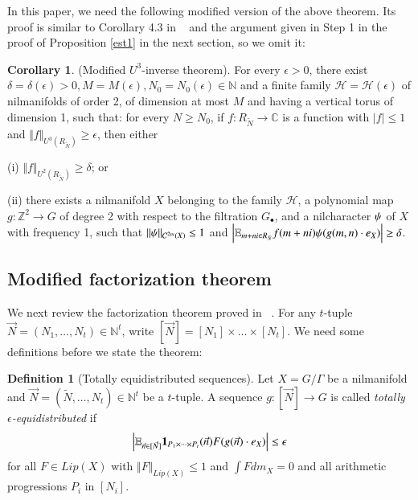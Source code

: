 \documentclass[12pt,amstex]{amsart}
\theoremstyle{definition}
\newtheorem{defn}[thm]{Definition}
\newtheorem{cor}[thm]{Corollary}
\def \d {\delta}
\def \e {\epsilon}
\def \R {R_{\tilde{N}}}
\def \ps {\bold{\psi}}
\begin{document}
In this paper, we need the following modified version of the above theorem.
Its proof is similar to Corollary 4.3 in ~\cite{FHel} and the argument given in Step 1 in the proof of Proposition \ref{est1} in the next section, so we omit it:

\begin{cor}\label{mIU3} (Modified $U^{3}$-inverse theorem).
  For every $\e>0$, there exist $\d=\d(\e)>0, M=M(\e),N_{0}=N_{0}(\e)\in\mathbb{N}$ and a finite family $\mathcal{H}=\mathcal{H}(\e)$ of nilmanifolds of order 2, of dimension at most $M$ and having a vertical torus of dimension 1, such that: for every $N\geq N_{0}$, if $f\colon \R\rightarrow\mathbb{C}$ is a function with $\vert f\vert\leq 1$ and $\Vert f\Vert_{U^{3}(\R)}\geq\e$, then either

  (i) $\Vert f\Vert_{U^{2}(\R)}\geq\d$; or

  (ii) there exists a nilmanifold $X$ belonging to the family $\mathcal{H}$, a polynomial map $g\colon\mathbb{Z}^{2}\rightarrow G$ of degree 2 with respect to the filtration $G_{\bullet}$, and a nilcharacter $\ps$ of $X$ with frequency 1, such that $\Vert\ps\Vert_{\mathcal{C}^{2m}(X)}\leq 1$ and $\Bigl\vert\mathbb{E}_{m+ni\in\R}f(m+ni)\ps(g(m,n)\cdot e_{X})\Bigr\vert\geq\d$.
\end{cor}


\subsection{Modified factorization theorem}
We next review the factorization theorem proved in ~\cite{GT}.
For any $t$-tuple $\vec{N}=(N_{1},\dots,N_{t})\in\mathbb{N}^{t}$, write $[\vec{N}]=[N_{1}]\times\dots\times[N_{t}]$.
We need some definitions before we state the theorem:

\begin{defn}[Totally equidistributed sequences]\label{equid}
  Let $X=G/\Gamma$ be a nilmanifold and $\vec{N}=(\tilde{N},\dots,N_{t})\in\mathbb{N}^{t}$ be a $t$-tuple. A sequence $g\colon[\vec{N}]\rightarrow G$ is called \emph{totally $\e$-equidistributed} if
    \begin{equation}\label{33}
  \begin{split}
  \Bigl\vert\mathbb{E}_{\vec{n}\in[\vec{N}]}\bold{1}_{P_{1}\times\dots\times P_{t}}(\vec{n})F(g(\vec{n})\cdot e_{X})\Bigr\vert\leq\e
  \end{split}
\end{equation}
for all $F\in Lip(X)$ with $\Vert F\Vert_{Lip(X)}\leq 1$ and $\int F dm_{X}=0$ and all arithmetic progressions $P_{i}$ in $[N_{i}]$.
\end{defn}
\end{document}
